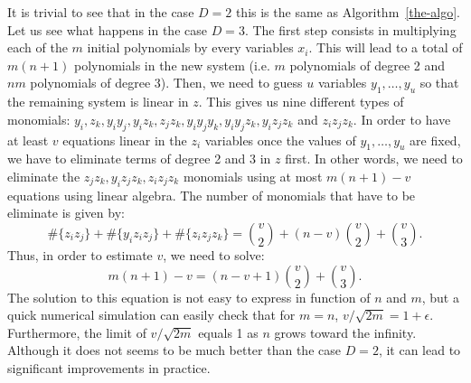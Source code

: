 \documentclass[a4paper,UKenglish,cleveref, autoref]{lipics-v2019}
\begin{document}
  It is trivial to see that in the case $D=2$ this is the same as Algorithm~\ref{the-algo}.
  Let us see what happens in the case $D=3$. The first step consists in multiplying each of
  the $m$ initial polynomials by every variables $x_i$. This will lead to a total of
  $m(n+1)$ polynomials in the new system (i.e. $m$ polynomials of degree 2 and $nm$ polynomials
  of degree 3). Then, we need to guess $u$ variables $y_1, \dots, y_u$ so that the remaining system
  is linear in $z$. This gives us nine different types of monomials:
  $y_i, z_k, y_iy_j, y_iz_k, z_jz_k, y_iy_jy_k, y_iy_jz_k, y_iz_jz_k$ and $z_iz_jz_k$.
  In order to have at least $v$ equations linear in the $z_i$ variables once the values of $y_1, \dots, y_u$
  are fixed, we have to eliminate terms of degree 2 and 3 in $z$ first. In other words,
  we need to eliminate the $z_jz_k, y_iz_jz_k, z_iz_jz_k$ monomials using at most $m(n+1) - v$ equations
  using linear algebra. The number of monomials that have to be eliminate is given by:
  \[
  \#\{z_iz_j\} + \#\{y_iz_iz_j\} +\#\{z_iz_jz_k\}
  = \binom{v}{2} + (n-v)\binom{v}{2} +\binom{v}{3}.
  \]
  Thus, in order to estimate $v$, we need to solve:
  \[
  m(n+1) -v = (n-v +1)\binom{v}{2} + \binom{v}{3}.
  \]
  The solution to this equation is not easy to express in function of $n$ and $m$, but a quick
  numerical simulation can easily check that for $m=n$, $v/\sqrt{2m} = 1+\epsilon$. Furthermore,
  the limit of $v/\sqrt{2m}$ equals 1 as $n$ grows toward the infinity. Although it does not seems
  to be much better than the case $D=2$, it can lead to significant improvements in
  practice.
  
  
  
\end{document}

